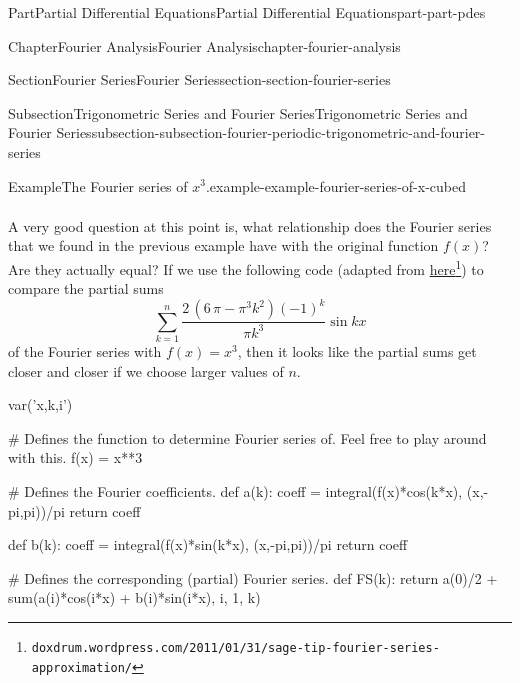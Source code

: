 \documentclass[twoside,10pt,]{book}
\numberwithin{equation}{part}
\begin{document}
\begin{partptx}{Part}{Partial Differential Equations}{}{Partial Differential Equations}{}{}{part-part-pdes}
\begin{chapterptx}{Chapter}{Fourier Analysis}{}{Fourier Analysis}{}{}{chapter-fourier-analysis}
\begin{sectionptx}{Section}{Fourier Series}{}{Fourier Series}{}{}{section-section-fourier-series}
\begin{subsectionptx}{Subsection}{Trigonometric Series and Fourier Series}{}{Trigonometric Series and Fourier Series}{}{}{subsection-subsection-fourier-periodic-trigonometric-and-fourier-series}
\begin{example}{Example}{The Fourier series of \(x^{3}\).}{example-example-fourier-series-of-x-cubed}
\begin{align*}
\end{align*}
%
\end{example}
A very good question at this point is, what relationship does the Fourier series that we found in the previous example have with the original function \(f(x)\)? Are they actually equal? If we use the following code (adapted from \href{https://doxdrum.wordpress.com/2011/01/31/sage-tip-fourier-series-approximation/}{here}\footnote{\nolinkurl{doxdrum.wordpress.com/2011/01/31/sage-tip-fourier-series-approximation/}\label{fn-subsection-fourier-periodic-trigonometric-and-fourier-series-l-c}}) to compare the partial sums%
\begin{equation*}
\sum_{k=1}^{n}\frac{2 \, {\left(6 \, \pi - \pi^{3} k^{2}\right)} \left(-1\right)^{k}}{\pi k^{3}}\sin kx
\end{equation*}
of the Fourier series with \(f(x) = x^{3}\), then it looks like the partial sums get closer and closer if we choose larger values of \(n\).%
\begin{sageinput}
var('x,k,i')

# Defines the function to determine Fourier series of. Feel free to play around with this.
f(x) = x**3

# Defines the Fourier coefficients.
def a(k):
  coeff = integral(f(x)*cos(k*x), (x,-pi,pi))/pi
  return coeff

def b(k):
  coeff = integral(f(x)*sin(k*x), (x,-pi,pi))/pi
  return coeff

# Defines the corresponding (partial) Fourier series.
def FS(k):
  return a(0)/2 + sum(a(i)*cos(i*x) + b(i)*sin(i*x), i, 1, k)


\end{sageinput}
\end{subsectionptx}
\end{sectionptx}
\end{chapterptx}
\end{partptx}
\end{document}
